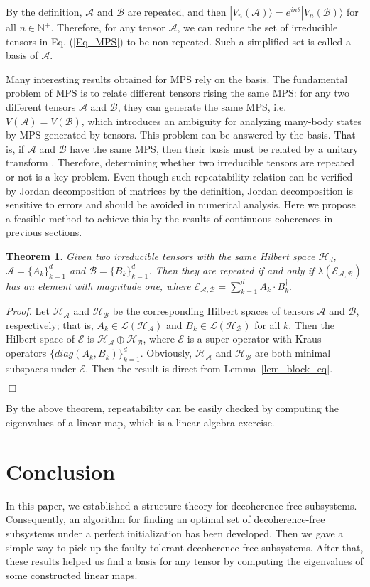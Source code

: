 \documentclass[journal]{IEEEtran}
\def\h{\ensuremath{\mathcal{H}}}
\def\l{\ensuremath{\mathcal{L}}}
\def\a{\ensuremath{\mathcal{A}}}
\def\b{\ensuremath{\mathcal{B}}}
\def\e{\ensuremath{\mathcal{E}}}
\def\l{\ensuremath{\mathcal{L}}}
\def\l{\mathcal{L}}
\newtheorem{theorem}{Theorem}
\begin{document}
By the definition, $\a$ and $\b$ are repeated, and then $|V_n(\a)\rangle=e^{in\theta}|V_n(\b)\rangle$ for all $n\in \mathbb{N^+}$. Therefore, for any tensor $\a$, we can reduce the set of irreducible tensors  in Eq. (\ref{Eq_MPS}) to be non-repeated. Such a simplified set is called a basis of $\a$. 

Many interesting results obtained for MPS rely on the basis.  The fundamental problem of MPS is to  relate different tensors rising the same MPS: for any two different tensors $\a$ and $\b$, they can generate the same MPS, i.e. $V(\a)=V(\b)$, which introduces an ambiguity for analyzing many-body states by MPS generated by tensors. This problem can be answered by the basis. That is, if $\a$ and $\b$ have the same MPS, then their basis must be related by a unitary transform \cite{cuevas2017irreducible}. Therefore, determining whether two irreducible tensors are  repeated or not  is a key problem. Even though such repeatability relation can be verified by Jordan decomposition of matrices by the definition, Jordan decomposition is sensitive to errors and should be avoided in numerical analysis. Here we propose a feasible method to achieve this by the results of continuous coherences in previous sections. 
\begin{theorem}
  Given two irreducible tensors with the same Hilbert space $\h_d$, $\a=\{A_{k}\}_{k=1}^{d}$ and $\b=\{B_{k}\}_{k=1}^{d}$. Then they are repeated if and only if $\lambda(\e_{\a,\b})$ has an element with magnitude one, where $\e_{\a,\b}=\sum_{k=1}^d A_{k}\cdot B_{k}^\dagger.$
\end{theorem}
{\it Proof.} Let $\h_\a$ and $\h_\b$ be the corresponding Hilbert spaces of tensors $\a$ and $\b$, respectively; that is, $A_k\in \l(\h_\a)$ and $B_k\in \l(\h_\b)$ for all $k$.  Then  the  Hilbert space of $\e$ is $\h_\a\oplus \h_\b$, where $\e$ is a super-operator with Kraus operators $\{diag(A_k,B_k)\}_{k=1}^d$. Obviously, $\h_\a$ and $\h_\b$ are both minimal subspaces under $\e$. Then the result is direct from Lemma~\ref{lem_block_eq}. 

\hfill $\Box$

By the above theorem, repeatability  can be easily checked by computing the eigenvalues of a linear map, which is a linear algebra exercise.  
\section{Conclusion}
In this paper, we established a structure theory for decoherence-free subsystems. Consequently, an algorithm for finding an optimal set of decoherence-free subsystems under a perfect initialization has been developed. Then we gave a simple way to pick up the faulty-tolerant decoherence-free subsystems. After that, these results helped us find a basis for any tensor by computing the eigenvalues of some constructed linear maps. 
\end{document}
